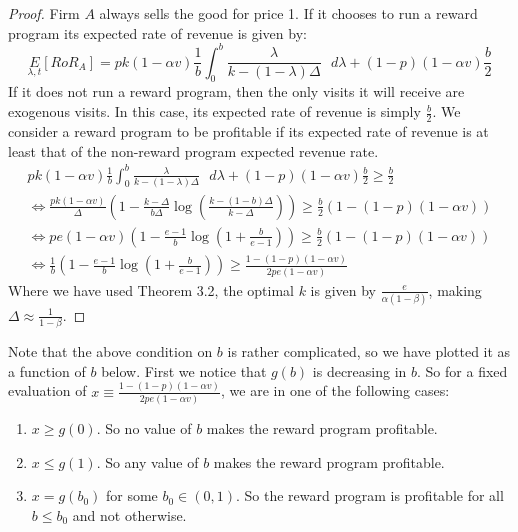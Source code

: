 \begin{proof}
Firm $A$ always sells the good for price 1. If it chooses to run a reward program its expected rate of revenue is given by:
\begin{equation*}
\underset{\lambda, t}E[RoR_A] = pk(1-\alpha v)\frac{1}{b}\int_0^b \frac{\lambda}{k-(1-\lambda)\Delta} \mbox{ } d\lambda + (1-p)(1-\alpha v)\frac{b}{2}
\end{equation*}
If it does not run a reward program, then the only visits it will receive are exogenous visits. In this case, its expected rate of revenue is simply $\frac{b}{2}$. We consider a reward program to be profitable if its expected rate of revenue is at least that of the non-reward program expected revenue rate.
\begin{gather*}
pk(1-\alpha v)\frac{1}{b}\int_0^b \frac{\lambda}{k-(1-\lambda)\Delta} \mbox{ } d\lambda + (1-p)(1-\alpha v)\frac{b}{2} \geq \frac{b}{2} \\
\iff \frac{pk(1-\alpha v)}{\Delta}\left(1-\frac{k-\Delta}{b\Delta}\log \left(\frac{k-(1-b)\Delta}{k-\Delta} \right) \right) \geq \frac{b}{2}(1-(1-p)(1-\alpha v)) \\
\iff pe(1-\alpha v)\left(1-\frac{e-1}{b}\log \left(1+\frac{b}{e-1} \right) \right) \geq \frac{b}{2}(1-(1-p)(1-\alpha v)) \\
\iff \frac{1}{b}\left(1-\frac{e-1}{b}\log \left(1+\frac{b}{e-1} \right) \right) \geq \frac{1-(1-p)(1-\alpha v)}{2pe(1-\alpha v)}
\end{gather*}
Where we have used Theorem 3.2, the optimal $k$ is given by $\frac{e}{\alpha(1-\beta)}$, making $\Delta \approx \frac{1}{1-\beta}$. 
\end{proof}

Note that the above condition on $b$ is rather complicated, so we have plotted it as a function of $b$ below. First we notice that $g(b)$ is decreasing in $b$. So for a fixed evaluation of $x \equiv \frac{1-(1-p)(1-\alpha v)}{2pe(1-\alpha v)}$, we are in one of the following cases:
\begin{enumerate}
\item
$x \geq g(0)$. So no value of $b$ makes the reward program profitable.
\item
$x \leq g(1)$. So any value of $b$ makes the reward program profitable.
\item
$x = g(b_0)$ for some $b_0 \in (0,1)$. So the reward program is profitable for all $b \leq b_0$ and not otherwise.
\end{enumerate}

